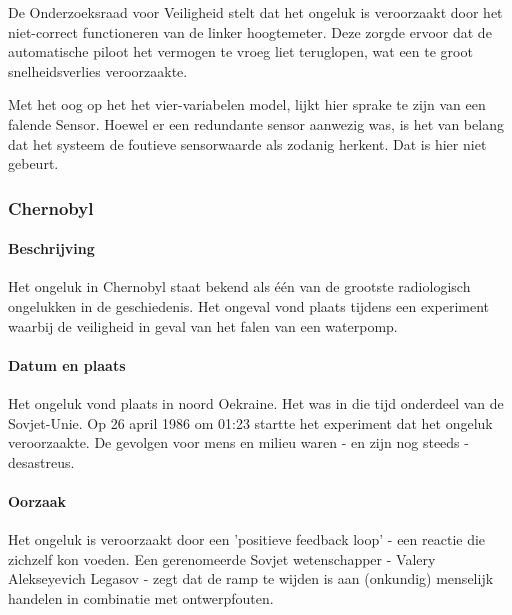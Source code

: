 \documentclass{article}
\begin{document}
\begin{itemize}
			De Onderzoeksraad voor Veiligheid stelt dat het ongeluk is veroorzaakt door het niet-correct functioneren van de linker hoogtemeter. Deze zorgde ervoor dat de automatische piloot het vermogen te vroeg liet teruglopen, wat een te groot snelheidsverlies veroorzaakte.

			Met het oog op het het vier-variabelen model, lijkt hier sprake te zijn van een falende Sensor. Hoewel er een redundante sensor aanwezig was, is het van belang dat het systeem de foutieve sensorwaarde als zodanig herkent. Dat is hier niet gebeurt.

				\end{itemize}
			
			\subsubsection{Chernobyl}

				\paragraph{Beschrijving}

					Het ongeluk in Chernobyl staat bekend als één van de grootste radiologisch ongelukken in de geschiedenis. Het ongeval vond plaats tijdens een experiment waarbij de veiligheid in geval van het falen van een waterpomp. \cite{ragheb2010chernobyl} \par

				\paragraph{Datum en plaats}

					Het ongeluk vond plaats in noord Oekraine. Het was in die tijd onderdeel van de Sovjet-Unie. Op 26 april 1986 om 01:23 startte het experiment dat het ongeluk veroorzaakte. De gevolgen voor mens en milieu waren - en zijn nog steeds - desastreus. \cite{BERESFORD201677} \par

				\paragraph{Oorzaak}

				Het ongeluk is veroorzaakt door een 'positieve feedback loop' - een reactie die zichzelf kon voeden. Een gerenomeerde Sovjet wetenschapper - Valery Alekseyevich Legasov - zegt dat de ramp te wijden is aan (onkundig) menselijk handelen in combinatie met ontwerpfouten. \par
\end{document}
